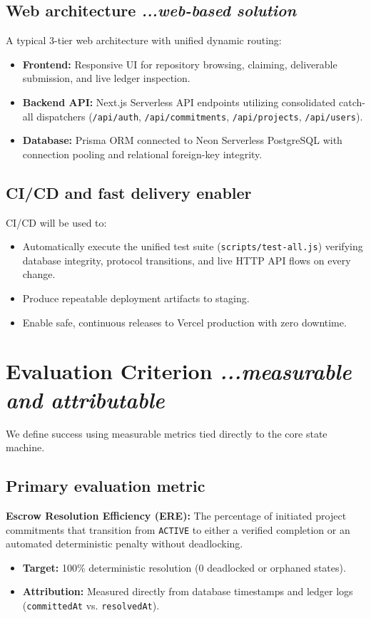 \documentclass[11pt,a4paper]{article}
\begin{document}
\subsection{Web architecture \hfill \normalfont\small\textit{...web-based solution}}
A typical 3-tier web architecture with unified dynamic routing:
\begin{itemize}
    \item \textbf{Frontend:} Responsive UI for repository browsing, claiming, deliverable submission, and live ledger inspection.
    \item \textbf{Backend API:} Next.js Serverless API endpoints utilizing consolidated catch-all dispatchers (\texttt{/api/auth}, \texttt{/api/commitments}, \texttt{/api/projects}, \texttt{/api/users}).
    \item \textbf{Database:} Prisma ORM connected to Neon Serverless PostgreSQL with connection pooling and relational foreign-key integrity.
\end{itemize}

\subsection{CI/CD and fast delivery enabler}
CI/CD will be used to:
\begin{itemize}
    \item Automatically execute the unified test suite (\texttt{scripts/test-all.js}) verifying database integrity, protocol transitions, and live HTTP API flows on every change.
    \item Produce repeatable deployment artifacts to staging.
    \item Enable safe, continuous releases to Vercel production with zero downtime.
\end{itemize}

\section{Evaluation Criterion \hfill \normalfont\small\textit{...measurable and attributable}}
We define success using measurable metrics tied directly to the core state machine.

\subsection{Primary evaluation metric}
\textbf{Escrow Resolution Efficiency (ERE):} The percentage of initiated project commitments that transition from \texttt{ACTIVE} to either a verified completion or an automated deterministic penalty without deadlocking.
\begin{itemize}
    \item \textbf{Target:} 100\% deterministic resolution (0 deadlocked or orphaned states).
    \item \textbf{Attribution:} Measured directly from database timestamps and ledger logs (\texttt{committedAt} vs. \texttt{resolvedAt}).
\end{itemize}
\end{document}
